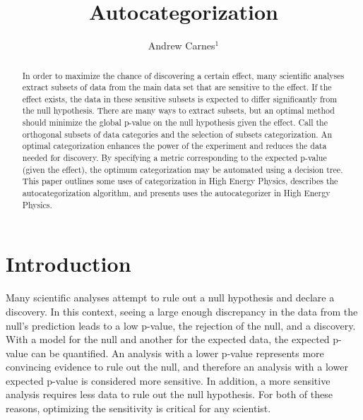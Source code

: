 \documentclass[review]{elsarticle}
\begin{document}
\begin{frontmatter}

\title{Autocategorization}

\author{Andrew Carnes$^{1}$}
\address{$^1$University of Florida}

\begin{abstract}
In order to maximize the chance of discovering a certain effect, many scientific analyses extract subsets of data from the main data set that are sensitive to the effect. If the effect exists, the data in these sensitive subsets is expected to differ significantly from the null hypothesis. There are many ways to extract subsets, but an optimal method should minimize the global p-value on the null hypothesis given the effect. Call the orthogonal subsets of data categories and the selection of subsets categorization. An optimal categorization enhances the power of the experiment and reduces the data needed for discovery. By specifying a metric corresponding to the expected p-value (given the effect), the optimum categorization may be automated using a decision tree. This paper outlines some uses of categorization in High Energy Physics, describes the autocategorization algorithm, and presents uses the autocategorizer in High Energy Physics. 
\end{abstract}


\end{frontmatter}

\linenumbers

\section{Introduction}

Many scientific analyses attempt to rule out a null hypothesis and declare a discovery. In this context, seeing a large enough discrepancy in the data from the null's prediction leads to a low p-value, the rejection of the null, and a discovery. With a model for the null and another for the expected data, the expected p-value can be quantified. An analysis with a lower p-value represents more convincing evidence to rule out the null, and therefore an analysis with a lower expected p-value is considered more sensitive. In addition, a more sensitive analysis requires less data to rule out the null hypothesis. For both of these reasons, optimizing the sensitivity is critical for any scientist.
\end{document}
